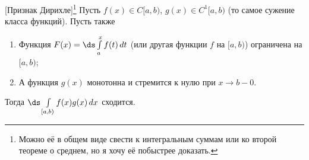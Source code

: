 [Признак Дирихле]\footnote{Можно её в общем виде свести к интегральным суммам или ко второй теореме о среднем, но я хочу её побыстрее доказать.}
	Пусть $f(x)\in C[a,b)$, $g(x)\in C^1[a,b)$ (то самое сужение класса функций). Пусть также
	\begin{enumerate}
	  \item Функция $F(x)=\ds\int\limits_a^xf(t)\,dt$ (или другая \tp{} функции $f$ на $[a,b)$) ограничена на $[a,b)$;
	  \item А функция $g(x)$ монотонна и стремится к нулю при $x\to b-0$.
	\end{enumerate}
	Тогда $\ds\int\limits_{[a,b)}f(x)g(x)\,dx$ сходится.
	